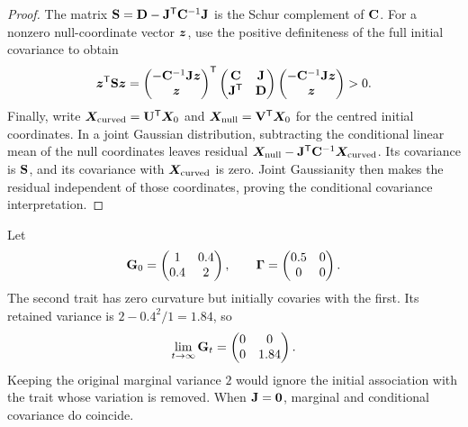 \begin{proof}
  The matrix $\mathbf{S}=\mathbf{D}-\mathbf{J}^{\mathsf T}\mathbf{C}^{-1}\mathbf{J}$
  is the Schur complement of $\mathbf{C}$. For a nonzero null-coordinate
  vector $\boldsymbol{z}$, use the positive definiteness of the full initial
  covariance to obtain
  \begin{equation}
    \boldsymbol{z}^{\mathsf T}\mathbf{S}\boldsymbol{z}
      =\begin{pmatrix}-\mathbf{C}^{-1}\mathbf{J}\boldsymbol{z}\\\boldsymbol{z}\end{pmatrix}^{\mathsf T}
        \begin{pmatrix}\mathbf{C}&\mathbf{J}\\\mathbf{J}^{\mathsf T}&\mathbf{D}\end{pmatrix}
        \begin{pmatrix}-\mathbf{C}^{-1}\mathbf{J}\boldsymbol{z}\\\boldsymbol{z}\end{pmatrix}>0.
  \end{equation}
  Finally, write $\boldsymbol{X}_{\mathrm{curved}}=\mathbf{U}^{\mathsf T}\boldsymbol{X}_0$
  and $\boldsymbol{X}_{\mathrm{null}}=\mathbf{V}^{\mathsf T}\boldsymbol{X}_0$ for the
  centred initial coordinates. In a joint Gaussian distribution,
  subtracting the conditional linear mean of the null coordinates leaves residual
  $\boldsymbol{X}_{\mathrm{null}}-\mathbf{J}^{\mathsf T}\mathbf{C}^{-1}
     \boldsymbol{X}_{\mathrm{curved}}$.
  Its covariance is $\mathbf{S}$, and its covariance with
  $\boldsymbol{X}_{\mathrm{curved}}$ is zero. Joint Gaussianity then makes the
  residual independent of those coordinates, proving the conditional
  covariance interpretation.
\end{proof}

\begin{example}
  \label{inheritance:singular-example}
  Let
  \begin{equation}
    \mathbf{G}_0=\begin{pmatrix}1&0.4\\0.4&2\end{pmatrix},
    \qquad
    \boldsymbol{\Gamma}=\begin{pmatrix}0.5&0\\0&0\end{pmatrix}.
  \end{equation}
  The second trait has zero curvature but initially covaries with the
  first. Its retained variance is
  $2-0.4^2/1=1.84$, so
  \begin{equation}
    \lim_{t\to\infty}\mathbf{G}_t
          =\begin{pmatrix}0&0\\0&1.84\end{pmatrix}.
  \end{equation}
  Keeping the original marginal variance $2$ would ignore the initial
  association with the trait whose variation is removed. When
  $\mathbf{J}=\mathbf{0}$, marginal and conditional covariance do coincide.
\end{example}

